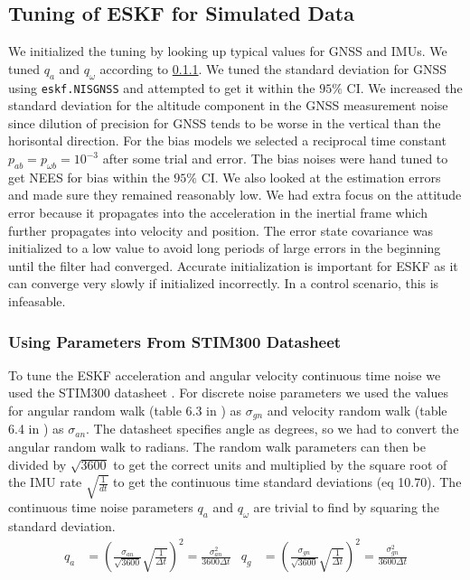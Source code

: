 \subsection{Tuning of ESKF for Simulated Data}
We initialized the tuning by looking up typical values for GNSS and IMUs. We tuned $q_a$ and $q_\omega$ according to \cref{sec:using_datasheet}. We tuned the standard deviation for GNSS using \texttt{eskf.NISGNSS} and attempted to get it within the $95\%$ CI. We increased the standard deviation for the altitude component in the GNSS measurement noise since dilution of precision for GNSS tends to be worse in the vertical than the horisontal direction. For the bias models we selected a reciprocal time constant $p_{ab} = p_{\omega b} = 10^{-3}$ after some trial and error. The bias noises were hand tuned to get NEES for bias within the $95\%$ CI. We also looked at the estimation errors and made sure they remained reasonably low. We had extra focus on the attitude error because it propagates into the acceleration in the inertial frame which further propagates into velocity and position. The error state covariance was initialized to a low value to avoid long periods of large errors in the beginning until the filter had converged. Accurate initialization is important for ESKF as it can converge very slowly if initialized incorrectly. In a control scenario, this is infeasable.

\subsubsection{Using Parameters From STIM300 Datasheet}\label{sec:using_datasheet}
To tune the ESKF acceleration and angular velocity continuous time noise we used the STIM300 datasheet \cite{stim300}. For discrete noise parameters we used the values for angular random walk (table 6.3 in \cite{stim300}) as $\sigma_{gn}$ and velocity random walk (table 6.4 in \cite{stim300}) as $\sigma_{an}$.
The datasheet specifies angle as degrees, so we had to convert the angular random walk to radians.
The random walk parameters can then be divided by $\sqrt{3600}$ to get the correct units and multiplied by the square root of the IMU rate $\sqrt{\frac{1}{dt}}$ to get the continuous time standard deviations (eq 10.70\cite{edmund}). The continuous time noise parameters $q_a$ and $q_\omega$ are trivial to find by squaring the standard deviation.
\begin{align}
q_a &= (\frac{\sigma_{an}}{\sqrt{3600}} \sqrt{\frac{1}{\Delta t}})^2 = \frac{\sigma_{an}^2}{3600 \Delta t} & q_g &= (\frac{\sigma_{gn}}{\sqrt{3600}}\sqrt{\frac{1}{\Delta t}})^2 = \frac{\sigma_{gn}^2}{3600 \Delta t} \label{eq:eskf-cont-noise}
\end{align}

